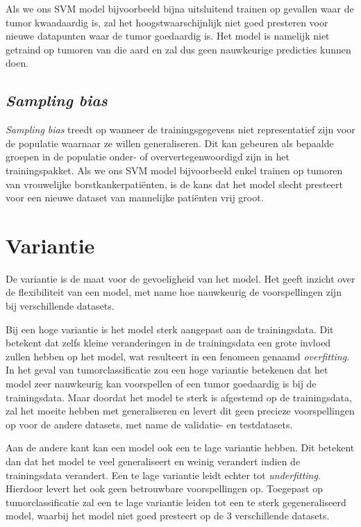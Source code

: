 \documentclass[TeamE-eindrapport]{subfiles}
\begin{document}
	Als we ons SVM model bijvoorbeeld bijna uitsluitend trainen op gevallen waar de tumor kwaadaardig is, zal het hoogstwaarschijnlijk niet goed presteren voor nieuwe datapunten waar de tumor goedaardig is. Het model is namelijk niet getraind op tumoren van die aard en zal dus geen nauwkeurige predicties kunnen doen.

	\subsection{\textit{Sampling bias}}
	
	\textit{Sampling bias} treedt op wanneer de trainingsgegevens niet representatief zijn voor de populatie waarnaar ze willen generaliseren. Dit kan gebeuren als bepaalde groepen in de populatie onder- of oververtegenwoordigd zijn in het trainingspakket. Als we ons SVM model bijvoorbeeld enkel trainen op tumoren van vrouwelijke borstkankerpatiënten, is de kans dat het model slecht presteert voor een nieuwe dataset van mannelijke patiënten vrij groot.
	
	\section{Variantie}
	
	De variantie is de maat voor de gevoeligheid van het model. Het geeft inzicht over de flexibiliteit van een model, met name hoe nauwkeurig de voorspellingen zijn bij verschillende datasets.

	Bij een hoge variantie is het model sterk aangepast aan de trainingsdata. Dit betekent dat zelfs kleine veranderingen in de trainingsdata een grote invloed zullen hebben op het model, wat resulteert in een fenomeen genaamd \textit{overfitting}. In het geval van tumorclassificatie zou een hoge variantie betekenen dat het model zeer nauwkeurig kan voorspellen of een tumor goedaardig is bij de trainingsdata. Maar doordat het model te sterk is afgestemd op de trainingsdata, zal het moeite hebben met generaliseren en levert dit geen precieze voorspellingen 	op voor de andere datasets, met name de validatie- en testdatasets.

	Aan de andere kant kan een model ook een te lage variantie hebben. Dit betekent dan dat het model te veel generaliseert en weinig verandert indien de trainingsdata verandert. Een te lage variantie leidt echter tot \textit{underfitting}. Hierdoor levert het ook geen betrouwbare voorspellingen op. Toegepast op tumorclassificatie zal een te lage variantie leiden tot een te sterk gegeneraliseerd model, waarbij het model niet goed presteert op de 3 verschillende datasets.
	
\end{document}
